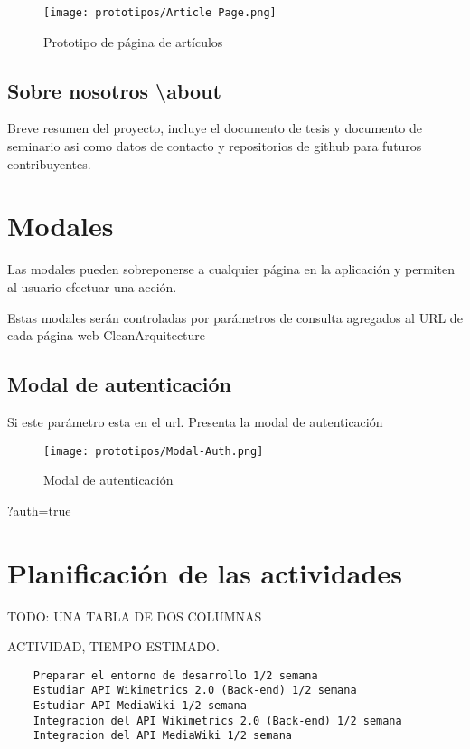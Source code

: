 \begin{figure}[H]
    \centering
    \texttt{[image: prototipos/Article Page.png]}
    \caption{Prototipo de página de artículos}
    \label{PrototipoSettingsPage}
\end{figure}

\subsection{Sobre nosotros \textbackslash about}
Breve resumen del proyecto, incluye el documento de tesis y documento de seminario asi como datos de contacto y repositorios de github para futuros contribuyentes.

\section{Modales}
Las modales pueden sobreponerse a cualquier página en la aplicación y permiten al usuario efectuar una acción.

Estas modales serán controladas por parámetros de consulta agregados al URL de cada página web
CleanArquitecture
\subsection{Modal de autenticación}

Si este parámetro esta en el url. Presenta la modal de autenticación

\begin{figure}[H]
    \centering
    \texttt{[image: prototipos/Modal-Auth.png]}
    \caption{Modal de autenticación}
    \label{ModalAuth}
\end{figure}
?auth=true

\section{Planificación de las actividades}

TODO: UNA TABLA DE DOS COLUMNAS

ACTIVIDAD, TIEMPO ESTIMADO.

\begin{lstlisting}
    Preparar el entorno de desarrollo 1/2 semana
    Estudiar API Wikimetrics 2.0 (Back-end) 1/2 semana
    Estudiar API MediaWiki 1/2 semana
    Integracion del API Wikimetrics 2.0 (Back-end) 1/2 semana
    Integracion del API MediaWiki 1/2 semana
\end{lstlisting}